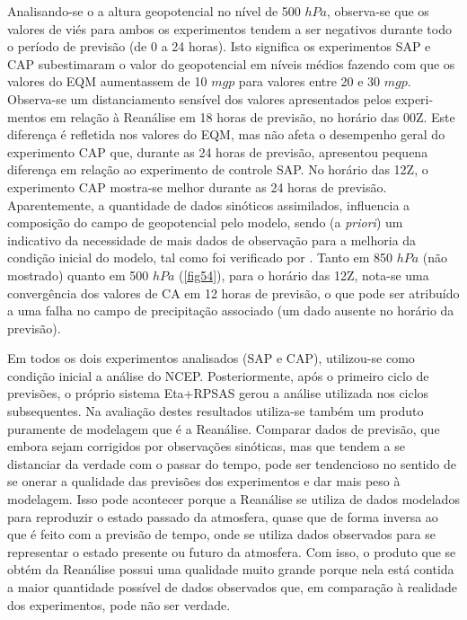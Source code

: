 Analisando-se o a altura geopotencial no nível de 500 $hPa$, observa-se que os valores de viés para ambos os experimentos tendem a ser negativos durante todo o período de previsão (de 0 a 24 horas). Isto significa os experimentos SAP e CAP subestimaram o valor do geopotencial em níveis médios fazendo com que os valores do EQM aumentassem de 10 $mgp$ para valores entre 20 e 30 $mgp$. Observa-se um distanciamento sensível dos valores apresentados pelos experi-mentos em relação à Reanálise em 18 horas de previsão, no horário das 00Z. Este diferença é refletida nos valores do EQM, mas não afeta o desempenho geral do experimento CAP que, durante as 24 horas de previsão, apresentou pequena diferença em relação ao experimento de controle SAP. No horário das 12Z, o experimento CAP mostra-se melhor durante as 24 horas de previsão. Aparentemente, a quantidade de dados sinóticos assimilados, influencia a composição do campo de geopotencial pelo modelo, sendo (a \textit{priori}) um indicativo da necessidade de mais dados de observação para a melhoria da condição inicial do modelo, tal como foi verificado por . Tanto em 850 $hPa$ (não mostrado) quanto em 500 $hPa$ (\autoref{fig54}), para o horário das 12Z, nota-se uma convergência dos valores de CA em 12 horas de previsão, o que pode ser atribuído a uma falha no campo de precipitação associado (um dado ausente no horário da previsão).

Em todos os dois experimentos analisados (SAP e CAP), utilizou-se como condição inicial a análise do NCEP. Posteriormente, após o primeiro ciclo de previsões, o próprio sistema Eta+RPSAS gerou a análise utilizada nos ciclos subsequentes. Na avaliação destes resultados utiliza-se também um produto puramente de modelagem que é a Reanálise. Comparar dados de previsão, que embora sejam corrigidos por observações sinóticas, mas que tendem a se distanciar da verdade com o passar do tempo, pode ser tendencioso no sentido de se onerar a qualidade das previsões dos experimentos e dar mais peso à modelagem. Isso pode acontecer porque a Reanálise se utiliza de dados modelados para reproduzir o estado passado da atmosfera, quase que de forma inversa ao que é feito com a previsão de tempo, onde se utiliza dados observados para se representar o estado presente ou futuro da atmosfera. Com isso, o produto que se obtém da Reanálise possui uma qualidade muito grande porque nela está contida a maior quantidade possível de dados observados que, em comparação à realidade dos experimentos, pode não ser verdade.

